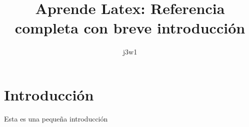 \documentclass[11pt]{article}
\title{Aprende Latex: Referencia completa con breve introducción}
\author{j3w1}
\begin{document}
    \maketitle

    \section{Introducción}\label{sec:introducción}
    Esta es una pequeña introducción
\end{document}
